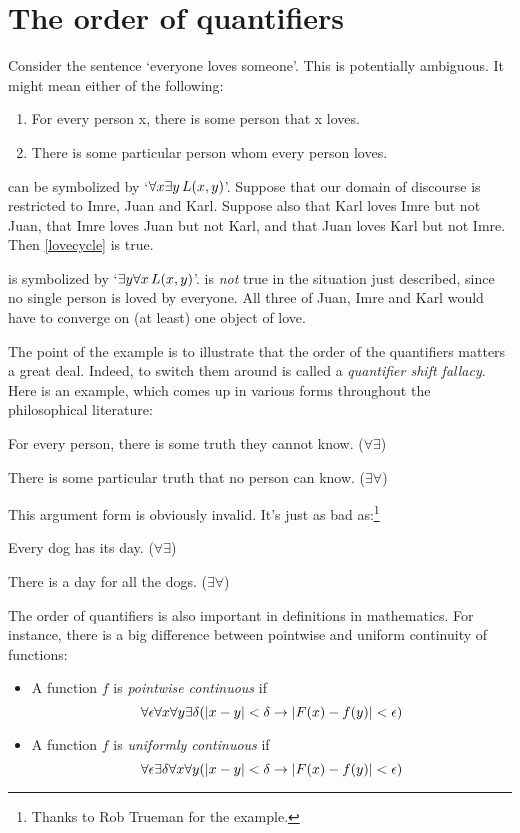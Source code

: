 \section{The order of quantifiers}\label{ss:OrderQuant}
Consider the sentence `everyone loves someone'. This is potentially ambiguous. It might mean either of the following:
	\begin{enumerate}
		\item\label{lovecycle} For every person x, there is some person that x loves.
		\item\label{loveconverge} There is some particular person whom every person loves.
	\end{enumerate}
 can be symbolized by `$\forall x \exists y\, L(x,y)$'. Suppose that our domain of discourse is restricted to Imre, Juan and Karl. Suppose also that Karl loves Imre but not Juan, that Imre loves Juan but not Karl, and that Juan loves Karl but not Imre. Then \cref*{lovecycle} is true.

 is symbolized by `$\exists y \forall x\,
L(x,y)$'.  is \emph{not} true in the
situation just described, since no single person is loved by everyone.
All three of Juan, Imre and Karl would have to converge on (at least)
one object of love.

The point of the example is to illustrate that the order of the quantifiers matters a great deal. Indeed, to switch them around is called a \emph{quantifier shift fallacy}. Here is an example, which comes up in various forms throughout the philosophical literature:
	\begin{earg}
		\item[] For every person, there is some truth they cannot know. \hfill ($\forall \exists$)
		\item[\texttherefore] There is some particular truth that no person can know. \hfill ($\exists \forall$)
	\end{earg}
This argument form is obviously invalid. It's just as bad as:\footnote{Thanks to Rob Trueman for the example.}
	\begin{earg}
		\item[] Every dog has its day. \hfill ($\forall \exists$)
		\item[\texttherefore] There is a day for all the dogs. \hfill ($\exists \forall$)
	\end{earg}

The order of quantifiers is also important in definitions in mathematics.  For instance, there is a big difference between pointwise and uniform continuity of functions:
\begin{itemize}
\item A function $f$ is \emph{pointwise continuous} if
\[
\forall \epsilon\forall x\forall y\exists \delta(\left|x - y\right| < \delta \to \left|F(x) - f(y)\right| < \epsilon)
\]
\item A function $f$ is \emph{uniformly continuous} if
\[
\forall \epsilon\exists \delta\forall x\forall y(\left|x - y\right| < \delta \to \left|F(x) - f(y)\right| < \epsilon)
\]
\end{itemize}

